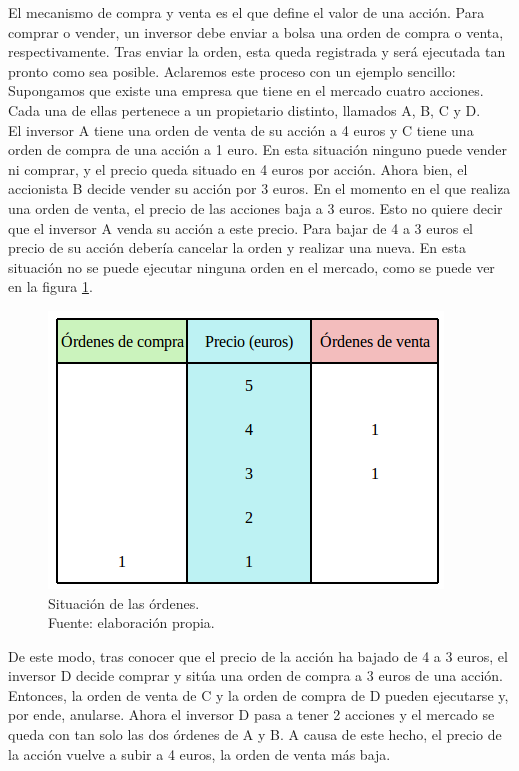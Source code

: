 El mecanismo de compra y venta es el que define el valor de una acci\'on. Para comprar o vender, un inversor debe enviar a bolsa una orden de compra o venta, respectivamente. Tras enviar la orden, esta queda registrada y ser\'a ejecutada tan pronto como sea posible. Aclaremos este proceso con un ejemplo sencillo:\\

Supongamos que existe una empresa que tiene en el mercado cuatro acciones. Cada una de ellas pertenece a un propietario distinto, llamados A, B, C y D. \\

El inversor A tiene una orden de venta de su acci\'on a 4 euros y C tiene una orden de compra de una acci\'on a 1 euro. En esta situaci\'on ninguno puede vender ni comprar, y el precio queda situado en 4 euros por acci\'on. Ahora bien, el accionista B decide vender su acci\'on por 3 euros. En el momento en el que realiza una orden de venta, el precio de las acciones baja a 3 euros. Esto no quiere decir que el inversor A venda su acci\'on a este precio. Para bajar de 4 a 3 euros el precio de su acci\'on deber\'ia cancelar la orden y realizar una nueva. En esta situaci\'on no se puede ejecutar ninguna orden en el mercado, como se puede ver en la figura \ref{fig:ordenes_ejemplo}.\\

\begin{figure}[H]
	\centering
	\includegraphics[scale=2]{imagenes/ordenes_ejemplo.png}
	\caption[Ejemplo de situaci\'on de las \'ordenes]{Situaci\'on de las \'ordenes.\\ Fuente: elaboraci\'on propia.}
	\label{fig:ordenes_ejemplo}
\end{figure}


De este modo, tras conocer que el precio de la acci\'on ha bajado de 4 a 3 euros, el inversor D decide comprar y sit\'ua una orden de compra a 3 euros de una acci\'on. Entonces, la orden de venta de C y la orden de compra de D pueden ejecutarse y, por ende, anularse. Ahora el inversor D pasa a tener 2 acciones y el mercado se queda con tan solo las dos \'ordenes de A y B. A causa de este hecho, el precio de la acci\'on vuelve a subir a 4 euros, la orden de venta m\'as baja.\\

